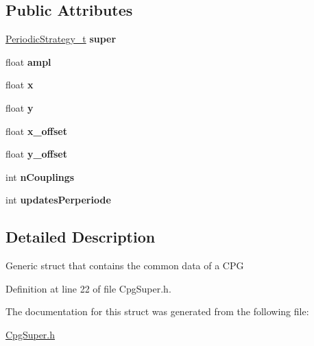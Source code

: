 \subsection*{Public Attributes}
\begin{DoxyCompactItemize}
\item 
\hypertarget{structCpgSuper__t_aa99be9897c811aa86c604e108749b7c9}{
\hyperlink{structPeriodicStrategy__t}{PeriodicStrategy\_\-t} {\bfseries super}}
\label{structCpgSuper__t_aa99be9897c811aa86c604e108749b7c9}

\item 
\hypertarget{structCpgSuper__t_a21e6439bdeaa0165c66bac3cea9af1ca}{
float {\bfseries ampl}}
\label{structCpgSuper__t_a21e6439bdeaa0165c66bac3cea9af1ca}

\item 
\hypertarget{structCpgSuper__t_a08ee6790801eb58b97bbfeb3a2e03c0f}{
float {\bfseries x}}
\label{structCpgSuper__t_a08ee6790801eb58b97bbfeb3a2e03c0f}

\item 
\hypertarget{structCpgSuper__t_a180e03f752e560a01701f259d093e210}{
float {\bfseries y}}
\label{structCpgSuper__t_a180e03f752e560a01701f259d093e210}

\item 
\hypertarget{structCpgSuper__t_abb63f43c57d17fec04d7d74860b6ed8a}{
float {\bfseries x\_\-offset}}
\label{structCpgSuper__t_abb63f43c57d17fec04d7d74860b6ed8a}

\item 
\hypertarget{structCpgSuper__t_a6657da40144f580d221bce9a8088fe5a}{
float {\bfseries y\_\-offset}}
\label{structCpgSuper__t_a6657da40144f580d221bce9a8088fe5a}

\item 
\hypertarget{structCpgSuper__t_a014344bdb123a5720ff44f0ca298a718}{
int {\bfseries nCouplings}}
\label{structCpgSuper__t_a014344bdb123a5720ff44f0ca298a718}

\item 
\hypertarget{structCpgSuper__t_a72afafe73672ae5db638ca8cd89fd7c9}{
int {\bfseries updatesPerperiode}}
\label{structCpgSuper__t_a72afafe73672ae5db638ca8cd89fd7c9}

\end{DoxyCompactItemize}


\subsection{Detailed Description}
Generic struct that contains the common data of a CPG 

Definition at line 22 of file CpgSuper.h.



The documentation for this struct was generated from the following file:\begin{DoxyCompactItemize}
\item 
\hyperlink{CpgSuper_8h}{CpgSuper.h}\end{DoxyCompactItemize}
